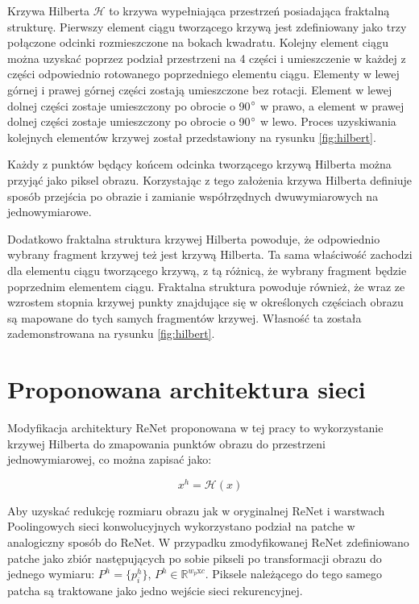 \documentclass[oneside, mag]{mgr}
\begin{document}
Krzywa Hilberta $\mathcal{H}$ to krzywa wypełniająca przestrzeń posiadająca fraktalną strukturę. Pierwszy element ciągu tworzącego krzywą jest zdefiniowany jako trzy połączone odcinki rozmieszczone na bokach kwadratu. Kolejny element ciągu można uzyskać poprzez podział przestrzeni na 4 części i umieszczenie w każdej z części odpowiednio rotowanego poprzedniego elementu ciągu. Elementy w lewej górnej i prawej górnej części zostają umieszczone bez rotacji. Element w lewej dolnej części zostaje umieszczony po obrocie o 90$\degree$ w prawo, a element w prawej dolnej części zostaje umieszczony po obrocie o 90$\degree$ w lewo. Proces uzyskiwania kolejnych elementów krzywej został przedstawiony na rysunku \ref{fig:hilbert}.

Każdy z punktów będący końcem odcinka tworzącego krzywą Hilberta można przyjąć jako piksel obrazu. Korzystając z tego założenia krzywa Hilberta definiuje sposób przejścia po obrazie i zamianie współrzędnych dwuwymiarowych na jednowymiarowe.

Dodatkowo fraktalna struktura krzywej Hilberta powoduje, że odpowiednio wybrany fragment krzywej też jest krzywą Hilberta. Ta sama właściwość zachodzi dla elementu ciągu tworzącego krzywą, z tą różnicą, że wybrany fragment będzie poprzednim elementem ciągu. Fraktalna struktura powoduje również, że wraz ze wzrostem stopnia krzywej punkty znajdujące się w określonych częściach obrazu są mapowane do tych samych fragmentów krzywej. Własność ta została zademonstrowana na rysunku \ref{fig:hilbert}.

\section{Proponowana architektura sieci}

Modyfikacja architektury ReNet proponowana w tej pracy to wykorzystanie krzywej Hilberta do zmapowania punktów obrazu do przestrzeni jednowymiarowej, co można zapisać jako:

\begin{equation}
	x^{h} = \mathcal{H}(x)
\end{equation}

Aby uzyskać redukcję rozmiaru obrazu jak w oryginalnej ReNet i warstwach Poolingowych sieci konwolucyjnych wykorzystano podział na patche w analogiczny sposób do ReNet. W przypadku zmodyfikowanej ReNet zdefiniowano patche jako zbiór następujących po sobie pikseli po transformacji obrazu do jednego wymiaru: $P^{h} = \{ p_{i}^h \}$, $P^{h} \in \mathbb{R}^{w_p \textrm{x} c}$. Piksele należącego do tego samego patcha są traktowane jako jedno wejście sieci rekurencyjnej.
\end{document}

